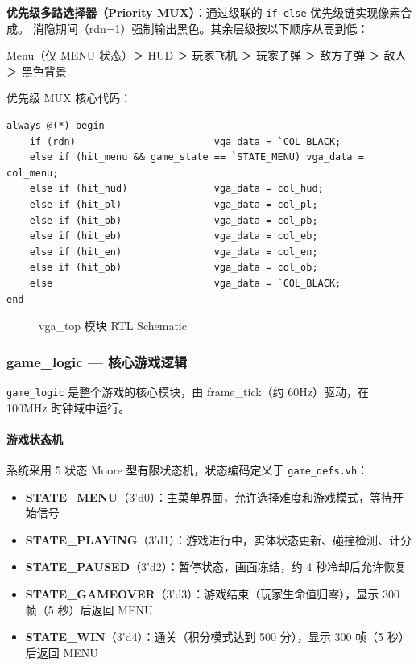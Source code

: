 \documentclass[12pt,a4paper]{ctexart}
\begin{document}
\textbf{优先级多路选择器（Priority MUX）}：通过级联的 \texttt{if-else} 优先级链实现像素合成。
消隐期间（rdn=1）强制输出黑色。其余层级按以下顺序从高到低：

\begin{center}
\small
Menu（仅 MENU 状态）＞ HUD ＞ 玩家飞机 ＞ 玩家子弹 ＞ 敌方子弹 ＞ 敌人 ＞ 黑色背景
\end{center}

优先级 MUX 核心代码：
\begin{lstlisting}
always @(*) begin
    if (rdn)                        vga_data = `COL_BLACK;
    else if (hit_menu && game_state == `STATE_MENU) vga_data = col_menu;
    else if (hit_hud)               vga_data = col_hud;
    else if (hit_pl)                vga_data = col_pl;
    else if (hit_pb)                vga_data = col_pb;
    else if (hit_eb)                vga_data = col_eb;
    else if (hit_en)                vga_data = col_en;
    else if (hit_ob)                vga_data = col_ob;
    else                            vga_data = `COL_BLACK;
end
\end{lstlisting}

\begin{figure}[H]
\centering
\caption{vga\_top 模块 RTL Schematic}
\label{fig:vgatop_rtl}
\end{figure}

\subsubsection{game\_logic --- 核心游戏逻辑}

\texttt{game\_logic} 是整个游戏的核心模块，由 frame\_tick（约 60Hz）驱动，在 100MHz 时钟域中运行。

\paragraph{游戏状态机}

系统采用 5 状态 Moore 型有限状态机，状态编码定义于 \texttt{game\_defs.vh}：

\begin{itemize}
    \item \textbf{STATE\_MENU}（3'd0）：主菜单界面，允许选择难度和游戏模式，等待开始信号
    \item \textbf{STATE\_PLAYING}（3'd1）：游戏进行中，实体状态更新、碰撞检测、计分
    \item \textbf{STATE\_PAUSED}（3'd2）：暂停状态，画面冻结，约 4 秒冷却后允许恢复
    \item \textbf{STATE\_GAMEOVER}（3'd3）：游戏结束（玩家生命值归零），显示 300 帧（5 秒）后返回 MENU
    \item \textbf{STATE\_WIN}（3'd4）：通关（积分模式达到 500 分），显示 300 帧（5 秒）后返回 MENU
\end{itemize}
\end{document}

